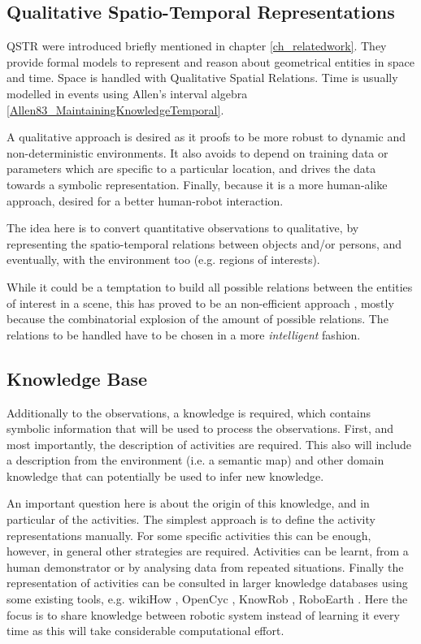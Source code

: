
\subsection{Qualitative Spatio-Temporal Representations}
QSTR were introduced briefly mentioned in chapter \ref{ch_relatedwork}.
They provide formal models to represent and reason about geometrical entities in space and time.
Space is handled with Qualitative Spatial Relations. %
Time is usually modelled in events using Allen's interval algebra \ref{Allen83_MaintainingKnowledgeTemporal}. %

A qualitative approach is desired as it proofs to be more robust to dynamic and non-deterministic environments.
It also avoids to depend on training data or parameters which are specific to a particular location, and drives the data towards a symbolic representation.
Finally, because it is a more human-alike approach, desired for a better human-robot interaction.

The idea here is to convert quantitative observations to qualitative, by representing the spatio-temporal relations between objects and/or persons, and eventually, with the environment too (e.g. regions of interests).

While it could be a temptation to build all possible relations between the entities of interest in a scene, this has proved to be an non-efficient approach \citep{Sridhar10_UnsupervisedLearning}, mostly because the combinatorial explosion of the amount  of possible relations. The relations to be handled have to be chosen in a more \textit{intelligent} fashion.


\subsection{Knowledge Base}
Additionally to the observations, a knowledge is required, which contains symbolic information that will be used to process the 
observations.
First, and most importantly, the description of activities are required.
This also will include a description from the environment (i.e. a semantic map) and other domain knowledge that can potentially be used to infer new knowledge.

An important question here is about the origin of this knowledge, and in particular of the activities.
The simplest approach is to define the activity representations manually.
For some specific activities this can be enough, however, in general other strategies are required.
Activities can be learnt, from a human demonstrator or by analysing data from repeated situations.
Finally the representation of activities can be consulted in larger knowledge databases using some existing tools, e.g. wikiHow \citep{web_WikiHow}, OpenCyc \citep{web_OpenCyc}, KnowRob \citep{Tenorth09_Knowrob}, RoboEarth \citep{Zweigle2009_RoboEarth}.
Here the focus is to share knowledge between robotic system instead of learning it every time as this will take considerable computational effort.


